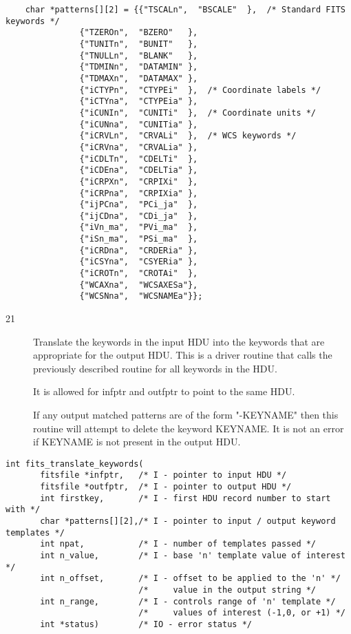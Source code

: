 \documentclass[11pt]{book}
\begin{document}
\begin{verbatim}
    char *patterns[][2] = {{"TSCALn",  "BSCALE"  },  /* Standard FITS keywords */
			   {"TZEROn",  "BZERO"   },
			   {"TUNITn",  "BUNIT"   },
			   {"TNULLn",  "BLANK"   },
			   {"TDMINn",  "DATAMIN" },
			   {"TDMAXn",  "DATAMAX" },
			   {"iCTYPn",  "CTYPEi"  },  /* Coordinate labels */
			   {"iCTYna",  "CTYPEia" },
			   {"iCUNIn",  "CUNITi"  },  /* Coordinate units */
			   {"iCUNna",  "CUNITia" },
			   {"iCRVLn",  "CRVALi"  },  /* WCS keywords */
			   {"iCRVna",  "CRVALia" },
			   {"iCDLTn",  "CDELTi"  },
			   {"iCDEna",  "CDELTia" },
			   {"iCRPXn",  "CRPIXi"  },
			   {"iCRPna",  "CRPIXia" },
			   {"ijPCna",  "PCi_ja"  },
			   {"ijCDna",  "CDi_ja"  },
			   {"iVn_ma",  "PVi_ma"  },
			   {"iSn_ma",  "PSi_ma"  },
			   {"iCRDna",  "CRDERia" },
			   {"iCSYna",  "CSYERia" },
			   {"iCROTn",  "CROTAi"  },
			   {"WCAXna",  "WCSAXESa"},
			   {"WCSNna",  "WCSNAMEa"}};
\end{verbatim}

\begin{description}
\item[21]  Translate the keywords in the input HDU into the keywords that are
appropriate for the output HDU.  This is a driver routine that calls
the previously described routine for all keywords in the HDU.

It is allowed for infptr and outfptr to point to the same HDU.

If any output matched patterns are of the form "-KEYNAME" then
this routine will attempt to delete the keyword KEYNAME.  It is
not an error if KEYNAME is not present in the output HDU.
\end{description}

\begin{verbatim}
int fits_translate_keywords(
	   fitsfile *infptr,   /* I - pointer to input HDU */
	   fitsfile *outfptr,  /* I - pointer to output HDU */
	   int firstkey,       /* I - first HDU record number to start with */
	   char *patterns[][2],/* I - pointer to input / output keyword templates */
	   int npat,           /* I - number of templates passed */
	   int n_value,        /* I - base 'n' template value of interest */
	   int n_offset,       /* I - offset to be applied to the 'n' */
 	                       /*     value in the output string */
	   int n_range,        /* I - controls range of 'n' template */
	                       /*     values of interest (-1,0, or +1) */
	   int *status)        /* IO - error status */
\end{verbatim}
\end{document}

